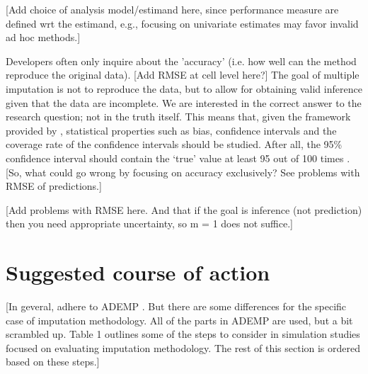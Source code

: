 \documentclass[bimj,fleqn]{w-art}
\theoremstyle{plain}
\theoremstyle{definition}
\begin{document}
[Add choice of analysis model/estimand here, since performance measure are defined wrt the estimand, e.g., focusing on univariate estimates may favor invalid ad hoc methods.]

Developers often only inquire about the 'accuracy' (i.e. how well can the method reproduce the original data). [Add RMSE at cell level here?] The goal of multiple imputation is not to reproduce the data, but to allow for obtaining valid inference given that the data are incomplete. We are interested in the correct answer to the research question; not in the truth itself. This means that, given the framework provided by \citet{rubi87}, statistical properties such as bias, confidence intervals and the coverage rate of the confidence intervals should be studied. After all, the 95\% confidence interval should contain the `true' value at least 95 out of 100 times \citep[][p. 591]{neym34}. [So, what could go wrong by focusing on accuracy exclusively? See problems with RMSE of predictions.]

[Add problems with RMSE here. And that if the goal is inference (not prediction) then you need appropriate uncertainty, so m = 1 does not suffice.]



\section{Suggested course of action}

[In geveral, adhere to ADEMP \citep{morr18}. But there are some differences for the specific case of imputation methodology. All of the parts in ADEMP are used, but a bit scrambled up. Table 1 outlines some of the steps to consider in simulation studies focused on evaluating imputation methodology. The rest of this section is ordered based on these steps.]
\end{document}
